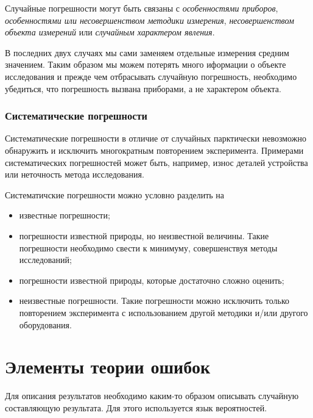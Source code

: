 \documentclass[12pt]{article}
\begin{document}
        Случайные погрешности могут быть связаны с \textit{особенностями приборов},
        \textit{особенностями или несовершенством методики измерения},
        \textit{несовершенством объекта измерений} или \textit{случайным характером явления}.

        В последних двух случаях мы сами заменяем отдельные измерения средним значением.
        Таким образом мы можем потерять много иформации о объекте исследования и
        прежде чем отбрасывать случайную погрешность, необходимо убедиться, что
        погрешность вызвана приборами, а не характером объекта.

      \subsubsection{Систематические погрешности}

        Систематические погрешности в отличие от случайных парктически невозможно
        обнаружить и исключить многократным повторением эксперимента. Примерами систематических
        погрешностей может быть, например, износ деталей устройства или неточность
        метода исследования.

        Систематичские погрешности можно условно разделить на

        \begin{itemize}

          \item известные погрешности;

          \item погрешности известной природы, но неизвестной величины. Такие погрешности
          необходимо свести к минимуму, совершенствуя методы исследований;

          \item погрешности известной природы, которые достаточно сложно оценить;

          \item неизвестные погрешности. Такие погрешности можно исключить только
          повторением эксперимента с использованием другой методики и/или другого
          оборудования.

        \end{itemize}

  \newpage
  \section{Элементы теории ошибок}

    Для описания результатов необходимо каким-то образом описывать случайную
    составляющую результата. Для этого используется язык вероятностей.
\end{document}
